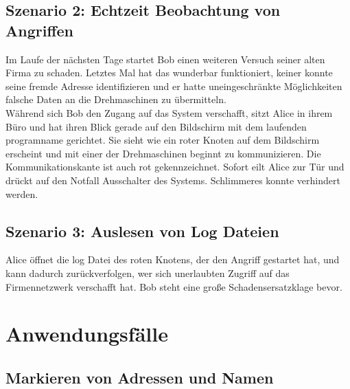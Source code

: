 \subsection{Szenario 2: Echtzeit Beobachtung von Angriffen}

Im Laufe der nächsten Tage startet Bob einen weiteren Versuch seiner alten Firma zu schaden. Letztes Mal hat das wunderbar funktioniert, keiner konnte seine fremde Adresse identifizieren und er hatte uneingeschränkte Möglichkeiten falsche Daten an die Drehmaschinen zu übermitteln.\\
Während sich Bob den Zugang auf das System verschafft, sitzt Alice in ihrem Büro und hat ihren Blick gerade auf den Bildschirm mit dem laufenden \gls{programname} gerichtet. Sie sieht wie ein roter Knoten auf dem Bildschirm erscheint und mit einer der Drehmaschinen beginnt zu kommunizieren. Die Kommunikationskante ist auch rot gekennzeichnet. Sofort eilt Alice zur Tür und drückt auf den Notfall Ausschalter des Systems. Schlimmeres konnte verhindert werden.

\subsection{Szenario 3: Auslesen von Log Dateien}

Alice öffnet die log Datei des roten Knotens, der den Angriff gestartet hat, und kann dadurch zurückverfolgen, wer sich unerlaubten Zugriff auf das Firmennetzwerk verschafft hat. Bob steht eine große Schadensersatzklage bevor.


\section{Anwendungsfälle}

\subsection{Markieren von Adressen und Namen}

